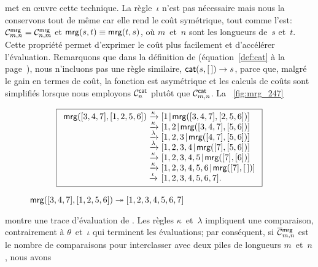 met en {\oe}uvre cette technique. La règle~\(\iota\) n'est pas
nécessaire mais nous la conservons tout de même car elle rend le coût
symétrique, tout comme  l'est:
\(\C{\fun{mrg}}{m,n} =
\C{\fun{mrg}}{n,m}\) et
\(\fun{mrg}(s,t) \equiv \fun{mrg}(t,s)\), où \(m\)~et~\(n\) sont les
longueurs de~\(s\) et~\(t\). Cette propriété permet d'exprimer le coût
plus facilement et d'accélérer l'évaluation. Remarquons que dans la
définition de 
(équation~\eqref{def:cat} à la page~\pageref{def:cat}), nous
n'incluons pas une règle similaire, \(\fun{cat}(s,\el) \rightarrow
s\), parce que, malgré le gain en termes de coût, la fonction est
asymétrique et les calculs de coûts sont simplifiés lorsque nous
employons \(\C{\fun{cat}}{n}\) plutôt
que \(\C{\fun{cat}}{m,n}\). La \fig~\vref{fig:mrg_247}
\begin{figure}
\begin{equation*}
\boxed{%
\begin{array}{r@{\;}l@{\;}l}
  \fun{mrg}([3,4,7],[1,2,5,6])
& \xrightarrow{\smash{\kappa}}
& \cons{1}{\fun{mrg}([3,4,7],[2,5,6])}\\
& \xrightarrow{\smash{\kappa}}
& \cons{1,2}{\fun{mrg}([3,4,7],[5,6])}\\
& \xrightarrow{\smash{\lambda}}
& \cons{1,2,3}{\fun{mrg}([4,7],[5,6])}\\
& \xrightarrow{\smash{\lambda}}
& \cons{1,2,3,4}{\fun{mrg}([7],[5,6])}\\
& \xrightarrow{\smash{\kappa}}
& \cons{1,2,3,4,5}{\fun{mrg}([7],[6])}\\
& \xrightarrow{\smash{\kappa}}
& \cons{1,2,3,4,5,6}{\fun{mrg}([7],\el)}\\
& \xrightarrow{\smash{\iota}}
& [1,2,3,4,5,6,7].
\end{array}}
\end{equation*}
\caption{\(\fun{mrg}([3,4,7],[1,2,5,6]) \twoheadrightarrow
  [1,2,3,4,5,6,7]\)}
\label{fig:mrg_247}
\end{figure}
montre une trace d'évaluation de . Les règles
\(\kappa\)~et~\(\lambda\) impliquent une comparaison, contrairement à
\(\theta\)~et~\(\iota\) qui terminent les évaluations; par conséquent,
si \(\OC{\fun{mrg}}{m,n}\) est le
nombre de comparaisons pour interclasser avec
 deux piles de longueurs
\(m\)~et~\(n\), nous avons
